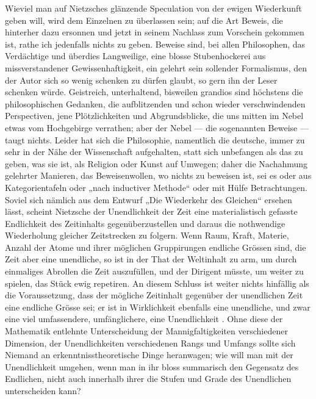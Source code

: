  Wieviel man auf Nietzsches glänzende Speculation von der ewigen Wiederkunft geben will, wird dem Einzelnen zu überlassen sein; auf die Art Beweis, die hinterher dazu ersonnen und jetzt in seinem Nachlass zum Vorschein gekommen ist, rathe ich jedenfalls nichts zu geben. Beweise sind, bei allen Philosophen, das Verdächtige und überdies Langweilige, eine blosse Stubenhockerei aus missverstandener Gewissenhaftigkeit, ein gelehrt sein sollender Formalismus, den der Autor sich so wenig schenken zu dürfen glaubt, so gern ihn der Leser schenken würde. Geistreich, unterhaltend, bisweilen grandios sind höchstens die philosophischen Gedanken, die aufblitzenden und schon wieder verschwindenden Perspectiven, jene Plötzlichkeiten und Abgrundsblicke, die uns mitten im Nebel etwas vom Hochgebirge verrathen; aber der Nebel — die sogenannten Beweise — taugt nichts. Leider hat sich die Philosophie, namentlich die deutsche, immer zu sehr in der Nähe der Wissenschaft aufgehalten, statt sich unbefangen als das zu geben, was sie ist, als Religion oder Kunst auf Umwegen; daher die Nachahmung gelehrter Manieren, das Beweisenwollen, wo nichts zu beweisen ist, sei es  oder aus Kategorientafeln oder „nach inductiver Methode“ oder mit Hülfe  Betrachtungen. Soviel sich nämlich aus dem Entwurf „Die Wiederkehr des Gleichen“ ersehen lässt, scheint Nietzsche der Unendlichkeit der Zeit eine materialistisch gefasste Endlichkeit des Zeitinhalts gegenüberzustellen und daraus die nothwendige Wiederholung gleicher Zeitstrecken zu folgern. Wenn Raum, Kraft, Materie, Anzahl der Atome und ihrer möglichen Gruppirungen endliche Grössen sind, die Zeit aber eine unendliche, so ist in der That der Weltinhalt zu arm, um durch einmaliges Abrollen die Zeit auszufüllen, und der Dirigent müsste, um weiter zu spielen, das Stück ewig repetiren. An diesem Schluss ist weiter nichts hinfällig als die Voraussetzung, dass der mögliche Zeitinhalt gegenüber der unendlichen Zeit eine endliche Grösse sei; er ist in Wirklichkeit ebenfalls eine unendliche, und zwar eine viel umfassendere, umfänglichere, eine Unendlichkeit . Ohne diese der Mathematik entlehnte Unterscheidung der Mannigfaltigkeiten verschiedener Dimension, der Unendlichkeiten verschiedenen Rangs und Umfangs sollte sich Niemand an erkenntnisstheoretische Dinge heranwagen; wie will man mit der Unendlichkeit umgehen, wenn man in ihr bloss summarisch den Gegensatz des Endlichen, nicht auch innerhalb ihrer die Stufen und Grade des Unendlichen unterscheiden kann?
\par

